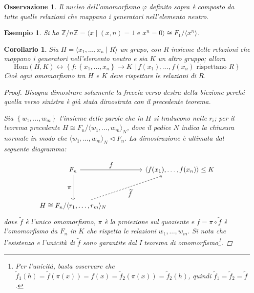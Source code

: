 \documentclass[11pt]{scrartcl}
\theoremstyle{style1}
\newtheorem{osservazione}{Osservazione}[section]
\newtheorem{corollario}{Corollario}[teorema]
\newtheorem{esempio}{Esempio}[section]
\numberwithin{equation}{subsection}
\begin{document}
\begin{osservazione}
Il nucleo dell'omomorfismo $\varphi $ definito sopra \`e composto da tutte quelle relazioni che mappano i generatori nell'elemento neutro.

\end{osservazione}
\begin{esempio}
Si ha $\mathbb{Z} / n\mathbb{Z} = \langle x  \mid (x,n) = 1 \text{ e } x^n = 0 \rangle\cong F_1 / \langle x^n \rangle$.
\end{esempio}
\begin{corollario}
	Sia $H = \langle x_1,\ldots,x_n  \mid R \rangle$ un grupo, con $R$ insieme delle relazioni che mappano i generatori nell'elemento neutro e sia $K$ un altro gruppo; allora
	\[
	\mathrm{Hom} (H,K) \longleftrightarrow \left\{ f :\left\{ x_1,\ldots,x_n \right\} \to K  \mid f(x_1),\ldots,f(x_n) \text{ rispettano } R \right\} 
	\] 
	Cio\`e ogni omomorfismo tra $H$ e $K$ deve rispettare le relazioni di $R$.
	\begin{proof}
Bisogna dimostrare solamente la freccia verso destra della biezione perch\'e quella verso sinistra \`e gi\`a stata dimostrata con il precedente teorema.

		Sia $\left\{ w_1,\ldots,w_m\right\} $ l'insieme delle parole che in $H$ si traducono nelle $r_i$; per il teorema precedente $H \cong F_n / \langle w_1,\ldots,w_m \rangle_N$, dove il pedice $N$ indica la chiusura normale in modo che $\langle w_1,\ldots,w_m \rangle_N\lhd F_n$.
		La dimostrazione \`e ultimata dal seguente diagramma:

		\[
		\begin{tikzcd}
			F_n & & \langle f(x_1), \ldots, f(x_n) \rangle \le  K\\
			\\
			H \cong F_n / \langle r_1,\ldots,r_m \rangle_N
			\arrow[from=1-1, to=1-3, "\displaystyle f"]
			\arrow["\displaystyle \pi"',from=1-1, to=3-1]
			\arrow[from=3-1, to=1-3,dashed,"\displaystyle \widetilde{f}"']
		\end{tikzcd}
		\] 
dove $\widetilde{f}$ \`e l'unico omomorfismo, $\pi$ \`e la proiezione sul quoziente e $f = \pi \circ \widetilde{f}$ \`e l'omomorfismo da $F_n$ in $K$ che rispetta le relazioni $w_1,\ldots,w_m$.
Si nota che l'esistenza e l'unicit\`a di $\widetilde{f}$ sono garantite dal I teorema di omomorfismo\footnote{Per l'unicit\`a, basta osservare che $\widetilde{f}_1(h) = \widetilde{f}(\pi(x)) = f(x) = \widetilde{f}_2(\pi(x)) = \widetilde{f}_2(h)$, quindi $\widetilde{f}_1 = \widetilde{f}_2 = \widetilde{f}$.}.
\end{proof}
\end{corollario}
\end{document}
